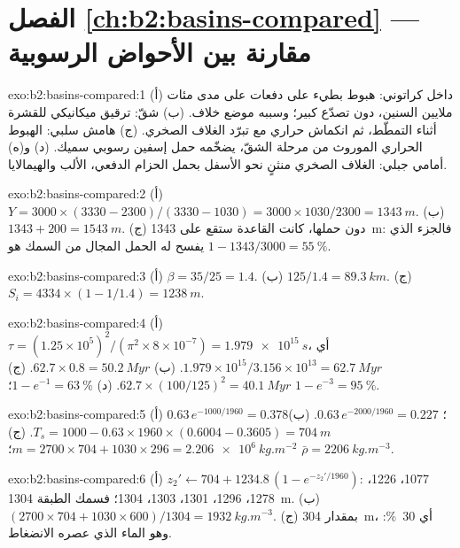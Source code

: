 \section*{الفصل \ref{ch:b2:basins-compared} --- مقارنة بين الأحواض الرسوبية}

\begin{solution}{exo:b2:basins-compared:1}
(أ) داخل كراتوني: هبوط بطيء على دفعات على مدى مئات ملايين السنين، دون تصدّع
كبير؛ وسببه موضع خلاف. (ب) شقّ: ترقيق ميكانيكي للقشرة أثناء التمطّط،
ثم انكماش حراري مع تبرّد الغلاف الصخري. (ج) هامش سلبي: الهبوط الحراري
الموروث من مرحلة الشقّ، يضخّمه حمل إسفين رسوبي سميك. (د) و(ه)
أمامي جبلي: الغلاف الصخري منثنٍ نحو الأسفل بحمل الحزام الدفعي، الألب والهيمالايا.
\end{solution}

\begin{solution}{exo:b2:basins-compared:2}
(أ) $Y = 3000\times(3330 - 2300)/(3330 - 1030) = 3000\times1030/2300 = \qty{1343}{m}$.
(ب) $1343 + 200 = \qty{1543}{m}$. (ج) دون حملها، كانت القاعدة ستقع على \qty{1343}{m}:
فالجزء الذي يفسح له الحمل المجال من السمك هو $1 - 1343/3000 = \qty{55}{\percent}$.
\end{solution}

\begin{solution}{exo:b2:basins-compared:3}
(أ) $\beta = 35/25 = 1.4$. (ب) $125/1.4 = \qty{89.3}{km}$. (ج) $S_i = 4334\times(1 - 1/1.4) =
\qty{1238}{m}$.
\end{solution}

\begin{solution}{exo:b2:basins-compared:4}
(أ) $\tau = (1.25\times10^{5})^2/(\pi^2\times8\times10^{-7}) = \qty{1.979e15}{s}$، أي
$1.979\times10^{15}/3.156\times10^{13} = \qty{62.7}{Myr}$. (ب) $62.7\times0.8 = \qty{50.2}{Myr}$.
(ج) $62.7\times(100/125)^2 = \qty{40.1}{Myr}$. (د) $1 - e^{-1} = \qty{63}{\percent}$؛ $1 -
e^{-3} = \qty{95}{\percent}$.
\end{solution}

\begin{solution}{exo:b2:basins-compared:5}
(أ) $0.63\,e^{-1000/1960} = 0.378$؛ $0.63\,e^{-2000/1960} = 0.227$. (ب) $T_s = 1000 -
0.63\times1960\times(0.6004 - 0.3605) = \qty{704}{m}$. (ج) $m = 2700\times704 + 1030\times296 =
\qty{2.206e6}{kg.m^{-2}}$؛ $\bar\rho = \qty{2206}{kg.m^{-3}}$.
\end{solution}

\begin{solution}{exo:b2:basins-compared:6}
(أ) $z_2' \leftarrow 704 + 1234.8\,(1 - e^{-z_2'/1960})$: 1077، 1226، 1278، 1296، 1301، 1303،
1304؛ فسمك الطبقة \qty{1304}{m}. (ب) $(2700\times704 + 1030\times600)/1304 =
\qty{1932}{kg.m^{-3}}$. (ج) بمقدار \qty{304}{m}، أي \qty{30}{\percent}: وهو الماء الذي
عصره الانضغاط.
\end{solution}

